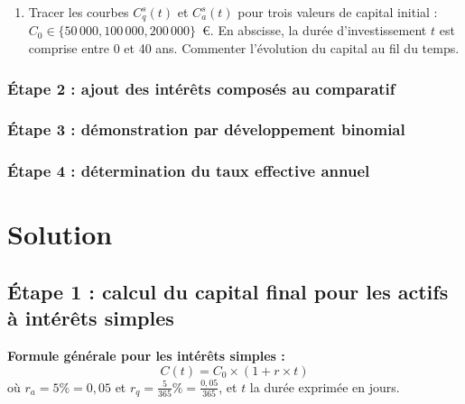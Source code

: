 \documentclass{article}
\begin{document}
\begin{enumerate}[label=\textbf{Q\arabic*.}]
    \item Tracer les courbes \( C^s_q(t) \) et \( C^s_a(t) \) pour trois valeurs de capital initial : \( C_0 \in \{50\,000, 100\,000, 200\,000\} \)~€. En abscisse, la durée d'investissement $t$ est comprise entre 0 et 40 ans. Commenter l'évolution du capital au fil du temps.

\end{enumerate}


\subsubsection*{Étape 2 : ajout des intérêts composés au comparatif}
\subsubsection*{Étape 3 : démonstration par développement binomial}
\subsubsection*{Étape 4 : détermination du taux effective annuel}


\section{Solution}
\subsection*{Étape 1 : calcul du capital final pour les actifs à intérêts simples}

\noindent
\textbf{Formule générale pour les intérêts simples :}
\[
C(t) = C_0 \times \left(1 + r \times t\right)
\]
où $r_a = 5\% = 0,05$ et \( r_q = \frac{5}{365}\% = \frac{0,05}{365} \), et \( t \) la durée exprimée en jours.
\end{document}
